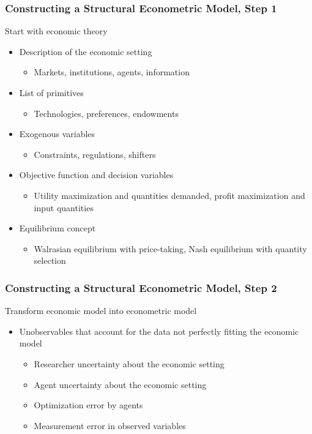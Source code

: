 \documentclass{beamer}\usepackage[]{graphicx}\usepackage[]{color}
\begin{document}
\begin{frame}\frametitle{Constructing a Structural Econometric Model, Step 1}
    Start with economic theory
    \begin{itemize}
        \item Description of the economic setting
        \begin{itemize}
            \item Markets, institutions, agents, information
        \end{itemize}
        \item List of primitives
        \begin{itemize}
            \item Technologies, preferences, endowments
        \end{itemize}
        \item Exogenous variables
        \begin{itemize}
            \item Constraints, regulations, shifters
        \end{itemize}
        \item Objective function and decision variables
        \begin{itemize}
            \item Utility maximization and quantities demanded, profit maximization and input quantities
        \end{itemize}
        \item Equilibrium concept
        \begin{itemize}
            \item Walrasian equilibrium with price-taking, Nash equilibrium with quantity selection
        \end{itemize}
    \end{itemize}
\end{frame}

\begin{frame}\frametitle{Constructing a Structural Econometric Model, Step 2}
    Transform economic model into econometric model
    \begin{itemize}
        \item Unobservables that account for the data not perfectly fitting the economic model
        \begin{itemize}
            \item Researcher uncertainty about the economic setting
            \item Agent uncertainty about the economic setting
            \item Optimization error by agents
            \item Measurement error in observed variables
        \end{itemize}
    \end{itemize}
\end{frame}
\end{document}
